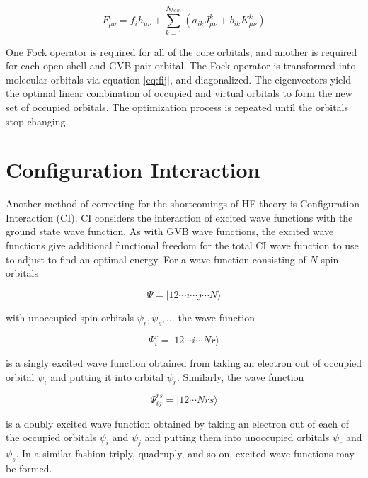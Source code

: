 \begin{equation}
  F^i_{\mu\nu} = f_ih_{\mu\nu} + 
	\sum_{k=1}^{N_{ham}} (a_{ik}J^k_{\mu\nu}+b_{ik}K^k_{\mu\nu})
\label{eq:f2.7}
\end{equation}

\noindent One Fock operator is required for all of the core orbitals,
and another is required for each open-shell and GVB pair orbital. The
Fock operator is transformed into molecular orbitals via equation
\ref{eq:fij}, and diagonalized. The eigenvectors yield the optimal
linear combination of occupied and virtual orbitals to form the new
set of occupied orbitals. The optimization process is repeated until
the orbitals stop changing.

\section{Configuration Interaction}
\label{sec2.8}
Another method of correcting for the shortcomings of HF theory is
Configuration Interaction \cite{Szabo82} (CI). CI considers the
interaction of excited wave functions with the ground
state wave function. As with GVB wave functions, the
excited wave functions give additional functional
freedom for the total CI wave function to use to
adjust to find an optimal energy. For a wave function
consisting of $N$ spin orbitals  

\begin{equation}
  \Psi = |12\cdots i\cdots j\cdots N\rangle
\end{equation}

\noindent with unoccupied spin orbitals $\psi_r, \psi_s, \dots$ the
wave function

\begin{equation}
  \Psi_i^r = |12\cdots i\cdots Nr\rangle
\end{equation}

\noindent is a singly excited wave function obtained from taking an
electron out of occupied orbital $\psi_i$ and putting it into orbital
$\psi_r$.  Similarly, the wave function

\begin{equation}
  \Psi_{ij}^{rs} = |12\cdots Nrs\rangle
\end{equation}

\noindent is a doubly excited wave function obtained by taking an
electron out of each of the occupied orbitals $\psi_i$ and $\psi_j$
and putting them into unoccupied orbitals $\psi_r$ and $\psi_s$. In a
similar fashion triply, quadruply, and so on, excited wave functions
may be formed.

